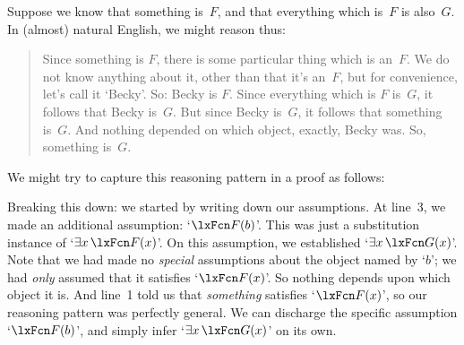 Suppose we know that something is~$F$, and that everything which is~$F$ is also~$G$. In (almost) natural English, we might reason thus:
	\begin{quote}
		Since something is $F$, there is some particular thing which is an~$F$. We do not know anything about it, other than that it's an~$F$, but for convenience, let's call it `Becky'. So: Becky is $F$. Since everything which is $F$ is~$G$, it follows that Becky is~$G$. But since Becky is~$G$, it follows that something is~$G$. And nothing depended on which object, exactly, Becky was. So, something is~$G$.
	\end{quote}
We might try to capture this reasoning pattern in a proof as follows:
\begin{fitchproof}
	\PR
	\PR
	\open
		\AS
		 
	\close
\end{fitchproof}\noindent
Breaking this down: we started by writing down our assumptions. At line~3, we made an additional assumption: `$\atom{F}{b}$'. This was just a substitution instance of `$\exists x\,\atom{F}{x}$'. On this assumption, we established `$\exists x\,\atom{G}{x}$'. Note that we had made no \emph{special} assumptions about the object named by `$b$'; we had \emph{only} assumed that it satisfies `$\atom{F}{x}$'. So nothing depends upon which object it is. And line~1 told us that \emph{something} satisfies `$\atom{F}{x}$', so our reasoning pattern was perfectly general. We can discharge the specific assumption `$\atom{F}{b}$', and simply infer `$\exists x\,\atom{G}{x}$' on its own.

